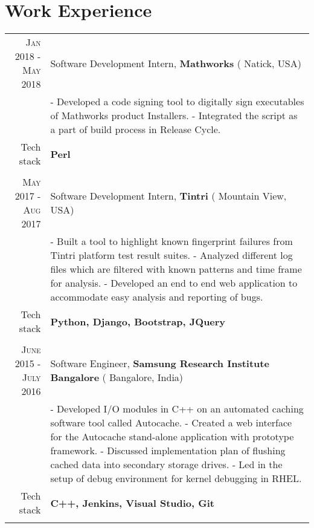\section {Work Experience}
\renewcommand{\arraystretch}{0.95}%
\begin{tabular}{r|p{14cm}}

\textsc {Jan 2018 - May 2018} & Software Development Intern, \textbf{Mathworks} ( Natick, USA)\\
& \small{
- Developed a code signing tool to digitally sign executables of Mathworks product Installers. \newline
- Integrated the script as a part of build process in Release Cycle.} \\
\small{Tech stack} &\footnotesize{\textbf{Perl}} \\
\multicolumn{2}{c}{} \\

\textsc {May 2017 - Aug 2017} & Software Development Intern, \textbf{Tintri} ( Mountain View, USA)\\
& \small{
- Built a tool to highlight known fingerprint failures from Tintri platform test result suites. \newline
- Analyzed different log files which are filtered with known patterns and time frame for analysis.\newline
- Developed an end to end web application to accommodate easy analysis and reporting of bugs.} \\
\small{Tech stack} &\footnotesize{\textbf{Python, Django, Bootstrap, JQuery}} \\
\multicolumn{2}{c}{} \\

\textsc {June 2015 - July 2016} & Software Engineer, \textbf{Samsung Research Institute Bangalore} ( Bangalore, India) \\
& \small{
- Developed I/O modules in C++ on an automated caching software tool called Autocache.\newline
- Created a web interface for the Autocache stand-alone application with prototype framework.\newline
- Discussed implementation plan of flushing cached data into secondary storage drives.\newline
- Led in the setup of debug environment for kernel debugging in RHEL.}\\
\small{Tech stack} &\footnotesize{\textbf{C++, Jenkins, Visual Studio, Git}} \\
\multicolumn{2}{c}{} \\



\end{tabular}
